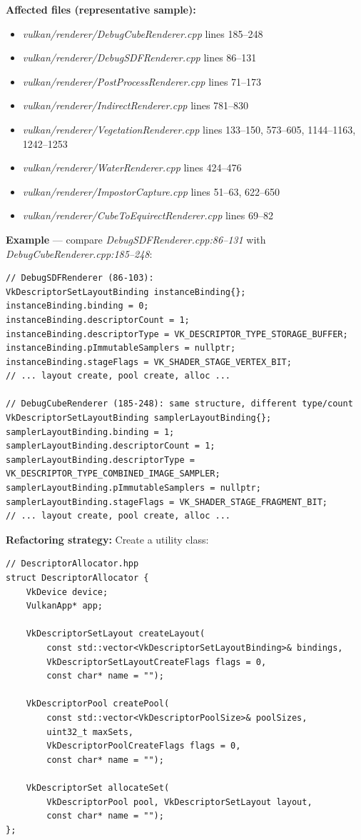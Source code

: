 \documentclass[11pt,a4paper]{article}
\newcommand{\code}[1]{\texttt{\detokenize{#1}}}
\newcommand{\file}[1]{\textsl{#1}}
\begin{document}
\textbf{Affected files (representative sample):}
\begin{itemize}
    \item \file{vulkan/renderer/DebugCubeRenderer.cpp} lines 185--248
    \item \file{vulkan/renderer/DebugSDFRenderer.cpp} lines 86--131
    \item \file{vulkan/renderer/PostProcessRenderer.cpp} lines 71--173
    \item \file{vulkan/renderer/IndirectRenderer.cpp} lines 781--830
    \item \file{vulkan/renderer/VegetationRenderer.cpp} lines 133--150, 573--605, 1144--1163, 1242--1253
    \item \file{vulkan/renderer/WaterRenderer.cpp} lines 424--476
    \item \file{vulkan/renderer/ImpostorCapture.cpp} lines 51--63, 622--650
    \item \file{vulkan/renderer/CubeToEquirectRenderer.cpp} lines 69--82
\end{itemize}

\textbf{Example} --- compare \file{DebugSDFRenderer.cpp:86--131} with \file{DebugCubeRenderer.cpp:185--248}:
\begin{lstlisting}
// DebugSDFRenderer (86-103):
VkDescriptorSetLayoutBinding instanceBinding{};
instanceBinding.binding = 0;
instanceBinding.descriptorCount = 1;
instanceBinding.descriptorType = VK_DESCRIPTOR_TYPE_STORAGE_BUFFER;
instanceBinding.pImmutableSamplers = nullptr;
instanceBinding.stageFlags = VK_SHADER_STAGE_VERTEX_BIT;
// ... layout create, pool create, alloc ...

// DebugCubeRenderer (185-248): same structure, different type/count
VkDescriptorSetLayoutBinding samplerLayoutBinding{};
samplerLayoutBinding.binding = 1;
samplerLayoutBinding.descriptorCount = 1;
samplerLayoutBinding.descriptorType = VK_DESCRIPTOR_TYPE_COMBINED_IMAGE_SAMPLER;
samplerLayoutBinding.pImmutableSamplers = nullptr;
samplerLayoutBinding.stageFlags = VK_SHADER_STAGE_FRAGMENT_BIT;
// ... layout create, pool create, alloc ...
\end{lstlisting}

\textbf{Refactoring strategy:} Create a \code{DescriptorAllocator} utility class:
\begin{lstlisting}
// DescriptorAllocator.hpp
struct DescriptorAllocator {
    VkDevice device;
    VulkanApp* app;

    VkDescriptorSetLayout createLayout(
        const std::vector<VkDescriptorSetLayoutBinding>& bindings,
        VkDescriptorSetLayoutCreateFlags flags = 0,
        const char* name = "");

    VkDescriptorPool createPool(
        const std::vector<VkDescriptorPoolSize>& poolSizes,
        uint32_t maxSets,
        VkDescriptorPoolCreateFlags flags = 0,
        const char* name = "");

    VkDescriptorSet allocateSet(
        VkDescriptorPool pool, VkDescriptorSetLayout layout,
        const char* name = "");
};
\end{lstlisting}
\end{document}
